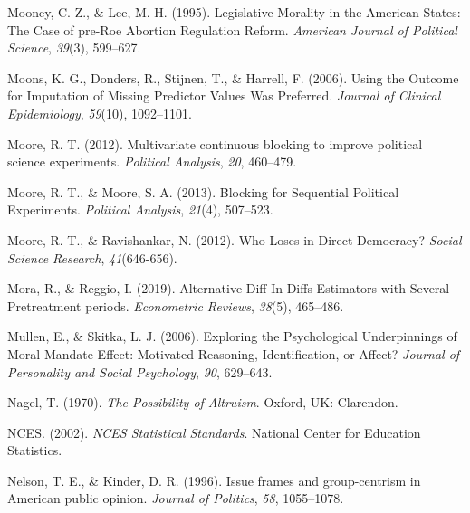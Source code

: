\documentclass[12pt,econ]{sources/authesis}
\newenvironment{CSLReferences}%
  {}%
  {\par}
\begin{document}
\begin{CSLReferences}{1}{0}
\leavevmode{}%
Mooney, C. Z., \& Lee, M.-H. (1995). {Legislative Morality in the American States: The Case of pre-Roe Abortion Regulation Reform}. \emph{American Journal of Political Science}, \emph{39}(3), 599--627.

\leavevmode{}%
Moons, K. G., Donders, R., Stijnen, T., \& Harrell, F. (2006). {Using the Outcome for Imputation of Missing Predictor Values Was Preferred}. \emph{Journal of Clinical Epidemiology}, \emph{59}(10), 1092--1101.

\leavevmode{}%
Moore, R. T. (2012). Multivariate continuous blocking to improve political science experiments. \emph{Political Analysis}, \emph{20}, 460--479.

\leavevmode{}%
Moore, R. T., \& Moore, S. A. (2013). Blocking for {Sequential} {Political} {Experiments}. \emph{Political Analysis}, \emph{21}(4), 507--523.

\leavevmode{}%
Moore, R. T., \& Ravishankar, N. (2012). {Who Loses in Direct Democracy?} \emph{Social Science Research}, \emph{41}(646-656).

\leavevmode{}%
Mora, R., \& Reggio, I. (2019). {Alternative Diff-In-Diffs Estimators with Several Pretreatment periods}. \emph{Econometric Reviews}, \emph{38}(5), 465--486.

\leavevmode{}%
Mullen, E., \& Skitka, L. J. (2006). {Exploring the Psychological Underpinnings of Moral Mandate Effect: Motivated Reasoning, Identification, or Affect?} \emph{Journal of Personality and Social Psychology}, \emph{90}, 629--643.

\leavevmode{}%
Nagel, T. (1970). \emph{{The Possibility of Altruism}}. Oxford, UK: Clarendon.

\leavevmode{}%
NCES. (2002). \emph{{NCES Statistical Standards}}. National Center for Education Statistics.

\leavevmode{}%
Nelson, T. E., \& Kinder, D. R. (1996). {Issue frames and group-centrism in American public opinion}. \emph{Journal of Politics}, \emph{58}, 1055--1078.


\end{CSLReferences}
\end{document}
